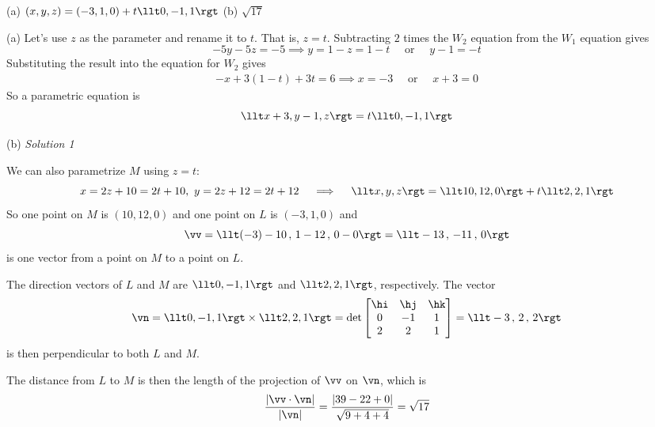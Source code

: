 %

\begin{answer}
(a) $(x,y,z) = (-3,1,0) +t \llt 0,-1,1\rgt$\qquad
(b) $\sqrt{17}$\qquad
\end{answer}

\begin{solution}
(a) Let's use $z$ as the parameter and rename it to $t$.
That is, $z=t$. Subtracting $2$ times the $W_2$ equation from the $W_1$
equation gives
\begin{equation*}
-5y -5z = -5
\implies y = 1-z = 1-t\quad\text{ or }\quad y-1=-t
\end{equation*}
Substituting the result into the equation for $W_2$ gives
\begin{align*}
-x +3(1-t) +3t =6
\implies x = -3\quad\text{ or }\quad x+3=0
\end{align*}
So a parametric equation is
\begin{equation*}
\llt x+3,y-1,z\rgt = t \llt 0,-1,1\rgt
\end{equation*}

(b) \emph{Solution 1}\ \ \ 

We can also parametrize $M$ using $z=t$:
\begin{equation*}
x=2z+10=2t+10,\ 
y=2z+12=2t+12\quad\implies\quad
\llt x,y,z\rgt = \llt 10,12,0\rgt +t \llt 2,2,1\rgt
\end{equation*}
So one point on $M$ is $(10,12,0)$ and one point on $L$ is $(-3,1,0)$ and
\begin{equation*}
\vv= \llt (-3)-10\,,\, 1 -12  \,,\,  0-0\rgt
   =\llt  -13 \,,\, -11  \,,\, 0\rgt
\end{equation*}
is one vector from a point on $M$ to a point on $L$.

The direction vectors of $L$ and $M$ are $\llt 0,-1,1\rgt$ and 
$\llt 2,2,1\rgt$, respectively. The vector
\begin{align*}
\vn = \llt 0,-1,1\rgt \times \llt 2,2,1\rgt
=\det\left[\begin{matrix}
            \hi  &  \hj  &  \hk \\
            0    &  -1   &    1 \\
            2    &   2   &    1 
            \end{matrix}\right]
=\llt -3 \,,\, 2 \,,\, 2 \rgt
\end{align*}
is then perpendicular to both $L$ and $M$.

The distance from $L$ to $M$ is then the length of the projection 
of $\vv$ on $\vn$, which is
\begin{align*}
\frac{|\vv\cdot\vn|}{|\vn|}
=\frac{|39-22+0|}{\sqrt{9+4+4}}
=\sqrt{17}
\end{align*}



\end{solution}

